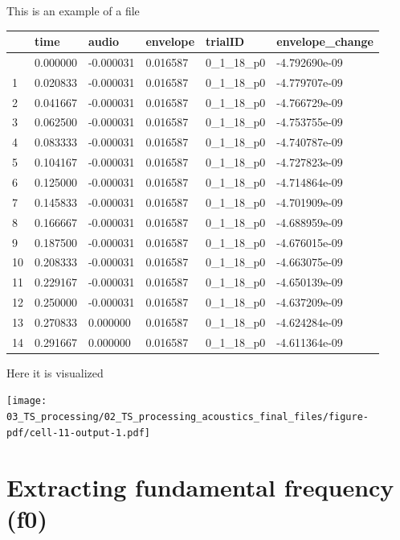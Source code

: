 \documentclass[
  letterpaper,
  DIV=11,
  numbers=noendperiod]{scrreprt}
\begin{document}
This is an example of a file

\begin{longtable}[]{@{}llllll@{}}
\toprule\noalign{}
& time & audio & envelope & trialID & envelope\_change \\
\midrule\noalign{}
\endhead
\bottomrule\noalign{}
\endlastfoot
0 & 0.000000 & -0.000031 & 0.016587 & 0\_1\_18\_p0 & -4.792690e-09 \\
1 & 0.020833 & -0.000031 & 0.016587 & 0\_1\_18\_p0 & -4.779707e-09 \\
2 & 0.041667 & -0.000031 & 0.016587 & 0\_1\_18\_p0 & -4.766729e-09 \\
3 & 0.062500 & -0.000031 & 0.016587 & 0\_1\_18\_p0 & -4.753755e-09 \\
4 & 0.083333 & -0.000031 & 0.016587 & 0\_1\_18\_p0 & -4.740787e-09 \\
5 & 0.104167 & -0.000031 & 0.016587 & 0\_1\_18\_p0 & -4.727823e-09 \\
6 & 0.125000 & -0.000031 & 0.016587 & 0\_1\_18\_p0 & -4.714864e-09 \\
7 & 0.145833 & -0.000031 & 0.016587 & 0\_1\_18\_p0 & -4.701909e-09 \\
8 & 0.166667 & -0.000031 & 0.016587 & 0\_1\_18\_p0 & -4.688959e-09 \\
9 & 0.187500 & -0.000031 & 0.016587 & 0\_1\_18\_p0 & -4.676015e-09 \\
10 & 0.208333 & -0.000031 & 0.016587 & 0\_1\_18\_p0 & -4.663075e-09 \\
11 & 0.229167 & -0.000031 & 0.016587 & 0\_1\_18\_p0 & -4.650139e-09 \\
12 & 0.250000 & -0.000031 & 0.016587 & 0\_1\_18\_p0 & -4.637209e-09 \\
13 & 0.270833 & 0.000000 & 0.016587 & 0\_1\_18\_p0 & -4.624284e-09 \\
14 & 0.291667 & 0.000000 & 0.016587 & 0\_1\_18\_p0 & -4.611364e-09 \\
\end{longtable}

Here it is visualized

\texttt{[image: 03\_TS\_processing/02\_TS\_processing\_acoustics\_final\_files/figure-pdf/cell-11-output-1.pdf]}


\chapter{Extracting fundamental frequency
(f0)}\label{extracting-fundamental-frequency-f0}
\end{document}
